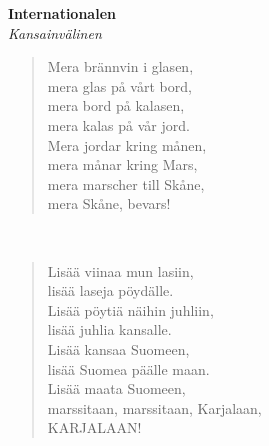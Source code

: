 %
%
\noindent\begin{minipage}{\linewidth}
\vspace{5pt}
\parbox[t]{0.85\linewidth}{\raggedright {\large\bf Internationalen}\\[2pt]\small\emph{Kansainvälinen}\\[6pt]}
\begin{verse}
	
	Mera brännvin i glasen,\\
	mera glas på vårt bord,\\
	mera bord på kalasen,\\
	mera kalas på vår jord.\\
	Mera jordar kring månen,\\
	mera månar kring Mars,\\
	mera marscher till Skåne,\\
	mera Skåne, bevars!\\
\end{verse}
\end{minipage}\\[10pt]
\noindent\begin{minipage}{\linewidth}
\begin{verse}
	Lisää viinaa mun lasiin,\\
	lisää laseja pöydälle.\\
	Lisää pöytiä näihin juhliin,\\
	lisää juhlia kansalle.\\
	Lisää kansaa Suomeen,\\
	lisää Suomea päälle maan.\\
	Lisää maata Suomeen,\\
	marssitaan, marssitaan, Karjalaan,\\
	KARJALAAN!\\
\end{verse}
\end{minipage}\\[10pt]
%
%
